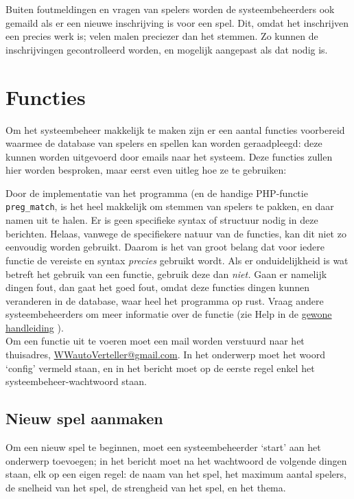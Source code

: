 \documentclass[12pt]{article}
\begin{document}
  Buiten foutmeldingen en vragen van spelers worden de systeembeheerders ook gemaild als er een nieuwe inschrijving is voor een spel. Dit, omdat het inschrijven een precies werk is; velen malen preciezer dan het stemmen. Zo kunnen de inschrijvingen gecontrolleerd worden, en mogelijk aangepast als dat nodig is.

\section{Functies}

  Om het systeembeheer makkelijk te maken zijn er een aantal functies voorbereid waarmee de database van spelers en spellen kan worden geraadpleegd: deze kunnen worden uitgevoerd door emails naar het systeem. Deze functies zullen hier worden besproken, maar eerst even uitleg hoe ze te gebruiken:
  
  Door de implementatie van het programma (en de handige PHP-functie {\tt preg\_match}, is het heel makkelijk om stemmen van spelers te pakken, en daar namen uit te halen. Er is geen specifieke syntax of structuur nodig in deze berichten. Helaas, vanwege de specifiekere natuur van de functies, kan dit niet zo eenvoudig worden gebruikt. Daarom is het van groot belang dat voor iedere functie de vereiste en syntax \emph{precies} gebruikt wordt. Als er onduidelijkheid is wat betreft het gebruik van een functie, gebruik deze dan \emph{niet.} Gaan er namelijk dingen fout, dan gaat het goed fout, omdat deze functies dingen kunnen veranderen in de database, waar heel het programma op rust. Vraag andere systeembeheerders om meer informatie over de functie (zie Help in de \href{http://www.liacs.nl/~vdekker/WW/pdf/man.pdf}{gewone handleiding} ).
  \\[\baselineskip]
  Om een functie uit te voeren moet een mail worden verstuurd naar het thuisadres, \href{mailto:<WWautoVerteller@gmail.com>}{WWautoVerteller@gmail.com}. In het onderwerp moet het woord `config' vermeld staan, en in het bericht moet op de eerste regel enkel het systeembeheer-wachtwoord staan.

  \subsection{Nieuw spel aanmaken}
  
    Om een nieuw spel te beginnen, moet een systeembeheerder `start' aan het onderwerp toevoegen; in het bericht moet na het wachtwoord de volgende dingen staan, elk op een eigen regel: de naam van het spel, het maximum aantal spelers, de snelheid van het spel, de strengheid van het spel, en het thema. 
    
\end{document}
